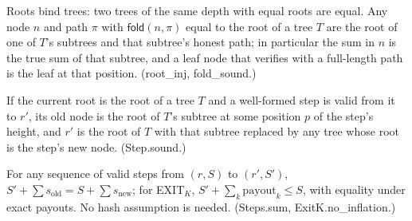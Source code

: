 \documentclass[runningheads]{llncs}
\newif\iffullversion
\newcommand{\Hnode}{\ensuremath{H_{\mathsf{node}}}}
\newcommand{\fold}{\ensuremath{\mathsf{fold}}}
\newcommand{\tr}[1]{\textsf{#1}}
\newcommand{\lean}[1]{{\small\textsf{#1}}}
\begin{document}
\begin{theorem}[Binding]\label{thm:binding}
Roots bind trees: two trees of the same depth with equal roots are equal.
Any node $n$ and path $\pi$ with $\fold(n, \pi)$ equal to the root of a
tree $T$ are the root of one of $T$'s subtrees and that subtree's honest
path; in particular the sum in $n$ is the true sum of that subtree, and a
leaf node that verifies with a full-length path is the leaf at that
position. (\lean{root\_inj}, \lean{fold\_sound}.)
\end{theorem}
\iffullversion
\begin{lstlisting}[style=leansig]
theorem root_inj {d} (t₁ t₂ : Tree d) : (t₁.root : Node H) = t₂.root → t₁ = t₂
theorem fold_sound {d} (t : Tree d) (m : Node H) (π : List (Bool × Node H)) :
    fold m π = t.root → ∃ (h : Nat) (p : Pos d h), m = (t.getSub p).root ∧ π = t.pathSub p
theorem fold_setSub {d h} (t : Tree d) (p : Pos d h) (s : Tree h) :
    fold s.root (t.pathSub p) = ((t.setSub p s).root : Node H)
\end{lstlisting}
\fi
\iffullversion
\begin{proof}[sketch]
Induction on the path. A non-empty path claims an internal node, so the
tree is not a tip by tag separation. Injectivity of $\Hnode$ on the
parent's preimage equates both children's hashes \emph{and} sums with the
claimed ones, and the induction hypothesis applies to the child the
direction bit selects. This is the only place the hash axioms are used.
\end{proof}
\fi

\begin{lemma}\label{lem:step}
If the current root is the root of a tree $T$ and a well-formed step is
valid from it to $r'$, its old node is the root of $T$'s subtree at some
position $p$ of the step's height, and $r'$ is the root of $T$ with that
subtree replaced by any tree whose root is the step's new node.
(\lean{Step.sound}.)
\end{lemma}

\begin{theorem}[Conservation]\label{thm:cons}
For any sequence of valid steps from $(r, S)$ to $(r', S')$,
$S' + \sum s_{\mathrm{old}} = S + \sum s_{\mathrm{new}}$; for
\tr{EXIT}$_K$, $S' + \sum_k \mathrm{payout}_k \le S$, with equality under
exact payouts. No hash assumption is needed.
(\lean{Steps.sum}, \lean{ExitK.no\_inflation}.)
\end{theorem}
\iffullversion
\begin{lstlisting}[style=leansig]
theorem Steps.sum {r r' : Node H} {ss : List (Step H)} (h : Steps r ss r') :
    r'.sum + oldSum ss = r.sum + newSum ss
theorem ExitK.no_inflation {exact} {r r'} {blocks} {out0} (h : ExitK exact r blocks r' out0) :
    out0 + payoutSum blocks ≤ r.sum      -- ExitK.exact_conservation: equality if exact
\end{lstlisting}
\fi
\end{document}
